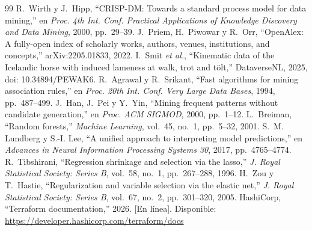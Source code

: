 \documentclass[conference,a4paper]{IEEEtran}
\begin{document}
\begin{thebibliography}{99}
 R.~Wirth y J.~Hipp, ``CRISP-DM: Towards a standard process model for data mining,'' en \emph{Proc. 4th Int. Conf. Practical Applications of Knowledge Discovery and Data Mining}, 2000, pp.~29--39.
 J.~Priem, H.~Piwowar y R.~Orr, ``OpenAlex: A fully-open index of scholarly works, authors, venues, institutions, and concepts,'' arXiv:2205.01833, 2022.
 I.~Smit \emph{et al.}, ``Kinematic data of the Icelandic horse with induced lameness at walk, trot and tölt,'' DataverseNL, 2025, doi: 10.34894/PEWAK6.
 R.~Agrawal y R.~Srikant, ``Fast algorithms for mining association rules,'' en \emph{Proc. 20th Int. Conf. Very Large Data Bases}, 1994, pp.~487--499.
 J.~Han, J.~Pei y Y.~Yin, ``Mining frequent patterns without candidate generation,'' en \emph{Proc. ACM SIGMOD}, 2000, pp.~1--12.
 L.~Breiman, ``Random forests,'' \emph{Machine Learning}, vol.~45, no.~1, pp.~5--32, 2001.
 S.~M. Lundberg y S.-I. Lee, ``A unified approach to interpreting model predictions,'' en \emph{Advances in Neural Information Processing Systems 30}, 2017, pp.~4765--4774.
 R.~Tibshirani, ``Regression shrinkage and selection via the lasso,'' \emph{J. Royal Statistical Society: Series B}, vol.~58, no.~1, pp.~267--288, 1996.
 H.~Zou y T.~Hastie, ``Regularization and variable selection via the elastic net,'' \emph{J. Royal Statistical Society: Series B}, vol.~67, no.~2, pp.~301--320, 2005.
 HashiCorp, ``Terraform documentation,'' 2026. [En línea]. Disponible: \url{https://developer.hashicorp.com/terraform/docs}
\end{thebibliography}
\end{document}
